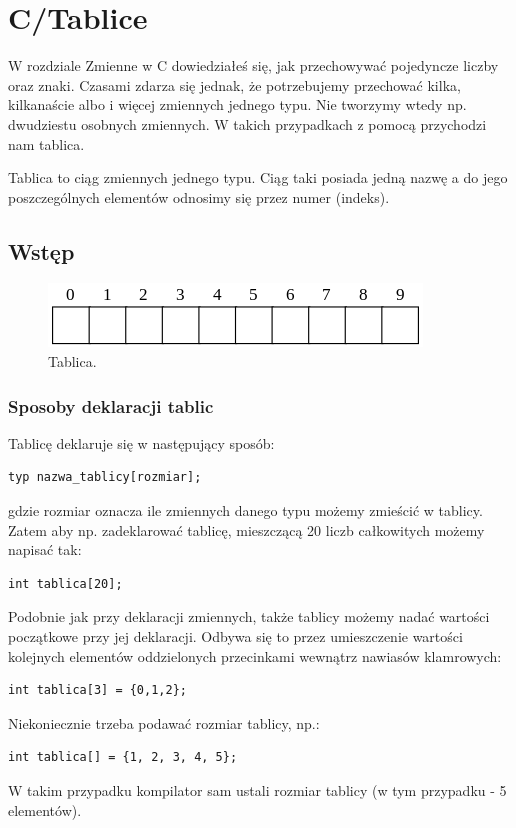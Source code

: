 \documentclass[a4paper,11pt]{article}
\begin{document}
\section*{C/Tablice} 
W rozdziale Zmienne w C dowiedziałeś się, jak przechowywać pojedyncze liczby oraz znaki. Czasami zdarza się jednak, że potrzebujemy przechować kilka, kilkanaście albo i więcej zmiennych jednego typu. Nie tworzymy wtedy np. dwudziestu osobnych zmiennych. W takich przypadkach z pomocą przychodzi nam tablica.

Tablica to ciąg zmiennych jednego typu. Ciąg taki posiada jedną nazwę a do jego poszczególnych elementów odnosimy się przez numer (indeks).

\subsection*{Wstęp} 
	\begin{figure}[!htb]
		\centerline{\includegraphics{Array}}
		\caption{Tablica.}
		\label{fig:Talbica dwuwymiarowa}
	\end{figure}
\subsubsection*{Sposoby deklaracji tablic}
Tablicę deklaruje się w następujący sposób:
	


\begin{verbatim}
typ nazwa_tablicy[rozmiar];
\end{verbatim}
gdzie rozmiar oznacza ile zmiennych danego typu możemy zmieścić w tablicy. Zatem aby np. zadeklarować tablicę, mieszczącą 20 liczb całkowitych możemy napisać tak:

\begin{lstlisting}[caption=Deklaracja tablicy, captionpos=b,
label=src:passive2,frame=TB,numbers=none]
int tablica[20];
\end{lstlisting}
Podobnie jak przy deklaracji zmiennych, także tablicy możemy nadać wartości początkowe przy jej deklaracji. Odbywa się to przez umieszczenie wartości kolejnych elementów oddzielonych przecinkami wewnątrz nawiasów klamrowych:
\begin{lstlisting}[caption=Deklaracja tablicy, captionpos=b,
label=src:passive2,frame=TB,numbers=none]
int tablica[3] = {0,1,2};
\end{lstlisting}
Niekoniecznie trzeba podawać rozmiar tablicy, np.:
\begin{lstlisting}[caption=Deklaracja tablicy, captionpos=b,
label=src:passive2,frame=TB,numbers=none]
int tablica[] = {1, 2, 3, 4, 5};
\end{lstlisting}
W takim przypadku kompilator sam ustali rozmiar tablicy (w tym przypadku - 5 elementów).
\end{document}
